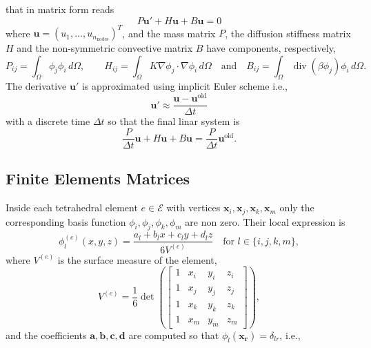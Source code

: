 \documentclass[hidelinks]{article}
\DeclareMathOperator{\divg}{div}
\begin{document}
that in matrix form reads \[ P\mathbf{u}' + H\mathbf{u} + B\mathbf{u} = 0\] where $\mathbf{u} = (u_1, \dots, u_{n_\text{nodes}})^T$, and the mass matrix $P$, the diffusion stiffness matrix $H$ and the non-symmetric convective matrix $B$ have components, respectively,
\[P_{ij} = \int_\Omega \phi_j \phi_i\, d\Omega ,\quad\quad H_{ij} = \int_\Omega K \nabla \phi_j \cdot \nabla \phi_i\, d\Omega \quad \text{and} \quad B_{ij} = \int_\Omega  \divg( \beta \phi_j) \phi_i\,d\Omega.\]
The derivative $\mathbf{u}'$ is approximated using implicit Euler scheme i.e., \[
\mathbf{u}' \approx \frac{\mathbf{u} - \mathbf{u}^\text{old}}{\Delta t}
\] with a discrete time $\Delta t$ so that the final linar system is 
\[ \frac{P}{\Delta t }\mathbf{u} + H\mathbf{u} + B\mathbf{u} = \frac{P}{\Delta t } \mathbf{u}^\text{old}.\]

\subsection{Finite Elements Matrices}

Inside each tetrahedral element $e\in\mathcal{E}$ with vertices $\mathbf{x}_i, \mathbf{x}_j, \mathbf{x}_k, \mathbf{x}_m$ only the corresponding basis function $\phi_i,\phi_j,\phi_k,\phi_m$ are non zero. Their local expression is 
\[
\phi_l^{(e)} (x,y,z)= \frac{a_l + b_l x + c_l y + d_l z}{6V^{(e)}} \quad \text{for } l \in \{i,j,k,m\},
\]
where $V^{(e)}$ is the surface measure of the element,
\[
V^{(e)} = \frac{1}{6}\det \left(\begin{bmatrix}
    1 & x_i & y_i & z_i \\ 1 & x_j & y_j & z_j\\ 1 & x_k & y_k & z_k \\ 1 & x_m & y_m & z_m
\end{bmatrix} \right),
\]
and the coefficients $\mathbf{a}, \mathbf{b}, \mathbf{c}, \mathbf{d}$ are computed so that $\phi_l(\mathbf{x_r}) = \delta_{lr}$, i.e., 
\end{document}
